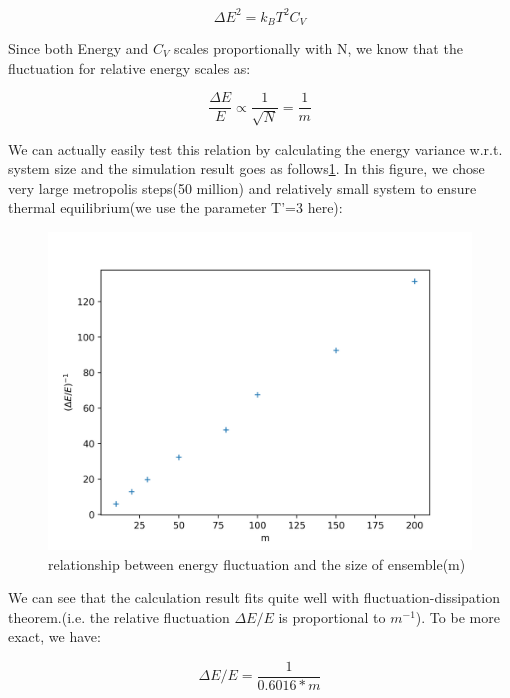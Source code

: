 \documentclass[11pt]{article}
\begin{document}
\begin{equation}
    \Delta E^2 = k_B T^2 C_V
\end{equation}

Since both Energy and $C_V$ scales proportionally with N, we know that the fluctuation for relative energy scales as:

\begin{equation}
    \frac{\Delta E}{E} \propto \frac{1}{\sqrt{N}} = \frac{1}{m}
\end{equation}

We can actually easily test this relation by calculating the energy variance w.r.t. system size and the simulation result goes as follows\ref{fluctuation}. In this figure, we chose very large metropolis steps(50 million) and relatively small system to ensure thermal equilibrium(we use the parameter T'=3 here):

\begin{figure}[H]
    \centering
    \includegraphics[scale = 0.7]{Figs_XYL/fluctuation-ensemblesize.png}
    \caption{relationship between energy fluctuation and the size of ensemble(m)}
    \label{fluctuation}
\end{figure}

We can see that the calculation result fits quite well with fluctuation-dissipation theorem.(i.e. the relative fluctuation $\Delta E/E$ is proportional to $m^{-1}$). To be more exact, we have:

\begin{equation}
    \Delta E/E = \frac{1}{0.6016 * m}
\end{equation}
\end{document}
